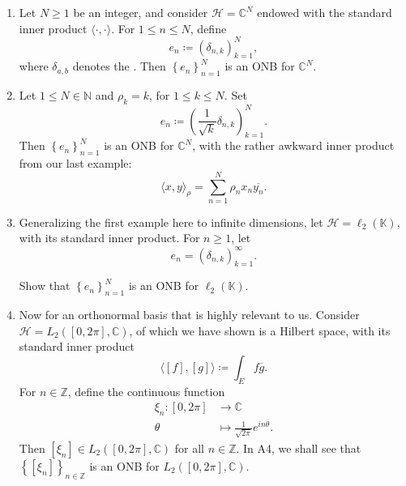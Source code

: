 \documentclass[notoc,notitlepage]{tufte-book}
\begin{document}
\begin{eg}
  \begin{enumerate}
    \item Let $N \geq 1$ be an integer,
      and consider $\mathcal{H} = \mathbb{C}^N$ endowed with
      the standard inner product $\langle \cdot, \cdot \rangle$.
      For $1 \leq n \leq N$, define
      \begin{equation*}
        e_n \coloneqq (\delta_{n, k})_{k=1}^{N},
      \end{equation*}
      where $\delta_{a, b}$ denotes the .
      Then $\left\{ e_n \right\}_{n=1}^{N}$ is an ONB for $\mathbb{C}^N$.

    \item Let $1 \leq N \in \mathbb{N}$ and $\rho_k = k$,
      for $1 \leq k \leq N$.
      Set
      \begin{equation*}
        e_n \coloneqq \left( \frac{1}{\sqrt{k}} \delta_{n,k} \right)_{k=1}^{N}.
      \end{equation*}
      Then $\left\{ e_n \right\}_{n=1}^{N}$ is 
      an ONB for $\mathbb{C}^N$, with the rather awkward inner product
      from our last example:
      \begin{equation*}
        \langle x, y \rangle_{\rho} = \sum_{n=1}^{N} \rho_n x_n \overline{y_n}.
      \end{equation*}

    \item Generalizing the first example here to infinite dimensions,
      let $\mathcal{H} = \ell_2(\mathbb{K})$, with its standard inner product.
      For $n \geq 1$, let
      \begin{equation*}
        e_n = \left( \delta_{n, k} \right)_{k=1}^{\infty}.
      \end{equation*}

      \begin{ex}
        Show that $\left\{ e_n \right\}_{n=1}^{N}$ is an ONB for
        $\ell_2(\mathbb{K})$.
      \end{ex}

    \item Now for an orthonormal basis that is highly relevant to us.
      Consider $\mathcal{H} = L_2([0, 2 \pi], \mathbb{C})$,
      of which we have shown is a Hilbert space, with its standard inner product
      \begin{equation*}
        \langle [f], [g] \rangle \coloneqq \int_{E} f \overline{g}.
      \end{equation*}
      For $n \in \mathbb{Z}$, define the continuous function
      \begin{align*}
        \xi_n : [0, 2 \pi] &\to \mathbb{C} \\
                \theta &\mapsto \frac{1}{\sqrt{2 \pi}} e^{in \theta}.
      \end{align*}  
      Then $[\xi_n] \in L_2([0, 2 \pi], \mathbb{C})$ for all $n \in \mathbb{Z}$.
      In A4, we shall see that $\left\{ [\xi_n] \right\}_{n \in \mathbb{Z}}$
      is an ONB for $L_2([0, 2 \pi], \mathbb{C})$.
  \end{enumerate}
\end{eg}
\end{document}
